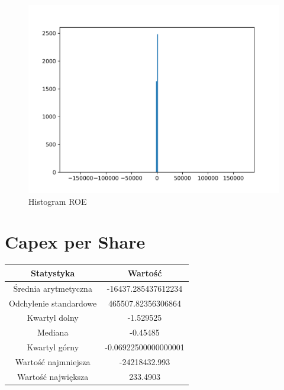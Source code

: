 \documentclass{article}
\begin{document}
\begin{figure}[h!]
    \includegraphics[width=\linewidth]{variables/ROE.png}
    \caption{Histogram ROE }
\end{figure}\section{ Capex per Share }

\begin{center}
    \begin{tabular}{|c | c|} 
    \hline
    Statystyka & Wartość \\
    \hline\hline
    Średnia arytmetyczna & -16437.285437612234 \\ 
    \hline
    Odchylenie standardowe & 465507.82356306864 \\
    \hline
    Kwartyl dolny & -1.529525 \\
    \hline
    Mediana & -0.45485 \\
    \hline
    Kwartyl górny & -0.06922500000000001 \\
    \hline
    Wartość najmniejsza & -24218432.993 \\
    \hline
    Wartość największa & 233.4903 \\
    \hline
   \end{tabular}
\end{center}
\end{document}
